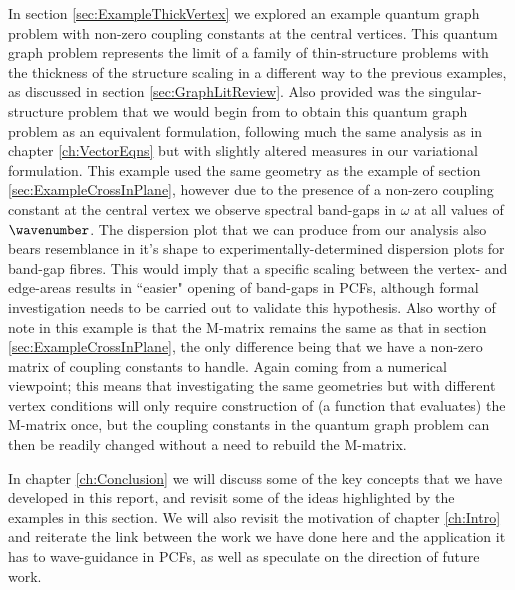 In section \ref{sec:ExampleThickVertex} we explored an example quantum graph problem with non-zero coupling constants at the central vertices.
This quantum graph problem represents the limit of a family of thin-structure problems with the thickness of the structure scaling in a different way to the previous examples, as discussed in section \ref{sec:GraphLitReview}.
Also provided was the singular-structure problem that we would begin from to obtain this quantum graph problem as an equivalent formulation, following much the same analysis as in chapter \ref{ch:VectorEqns} but with slightly altered measures in our variational formulation.
This example used the same geometry as the example of section \ref{sec:ExampleCrossInPlane}, however due to the presence of a non-zero coupling constant at the central vertex we observe spectral band-gaps in $\omega$ at all values of $\wavenumber$.
The dispersion plot that we can produce from our analysis also bears resemblance in it's shape to experimentally-determined dispersion plots for band-gap fibres.
This would imply that a specific scaling between the vertex- and edge-areas results in ``easier" opening of band-gaps in PCFs, although formal investigation needs to be carried out to validate this hypothesis.
Also worthy of note in this example is that the M-matrix remains the same as that in section \ref{sec:ExampleCrossInPlane}, the only difference being that we have a non-zero matrix of coupling constants to handle.
Again coming from a numerical viewpoint; this means that investigating the same geometries but with different vertex conditions will only require construction of (a function that evaluates) the M-matrix once, but the coupling constants in the quantum graph problem can then be readily changed without a need to rebuild the M-matrix. \newline

In chapter \ref{ch:Conclusion} we will discuss some of the key concepts that we have developed in this report, and revisit some of the ideas highlighted by the examples in this section.
We will also revisit the motivation of chapter \ref{ch:Intro} and reiterate the link between the work we have done here and the application it has to wave-guidance in PCFs, as well as speculate on the direction of future work.